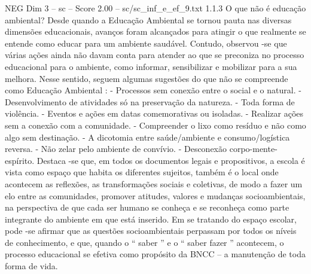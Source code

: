 \begin{textsample}{NEG Dim 3 – sc – Score 2.00 – sc/sc\_inf\_e\_ef\_9.txt}  \label{ex:f3_neg_230}
1.1.3 O que não é educação ambiental?
Desde quando a Educação Ambiental se tornou pauta nas diversas dimensões educacionais, avanços foram alcançados para atingir o que realmente se entende como educar para um ambiente saudável.
Contudo, observou -se que várias ações ainda não davam conta para atender ao que se preconiza no processo educacional para o ambiente, como informar, sensibilizar e mobilizar para a sua melhora.
Nesse sentido, seguem algumas sugestões do que não se compreende como Educação Ambiental : - Processos sem conexão entre o social e o natural. - Desenvolvimento de atividades só na preservação da natureza. - Toda forma de violência. - Eventos e ações em datas comemorativas ou isoladas. - Realizar ações sem a conexão com a comunidade. - Compreender o lixo como resíduo e não como algo sem destinação. - A dicotomia entre saúde/ambiente e consumo/logística reversa. - Não zelar pelo ambiente de convívio. - Desconexão corpo-mente-espírito.
Destaca -se que, em todos os documentos legais e propositivos, a escola é vista como espaço que habita os diferentes sujeitos, também é o local onde acontecem as reflexões, as transformações sociais e coletivas, de modo a fazer um elo entre as comunidades, promover atitudes, valores e mudanças socioambientais, na perspectiva de que cada ser humano se conheça e se reconheça como parte integrante do ambiente em que está inserido.
Em se tratando do espaço escolar, pode -se afirmar que as questões socioambientais perpassam por todos os níveis de conhecimento, e que, quando o “ saber ” e o “ saber fazer ” acontecem, o processo educacional se efetiva como propósito da BNCC – a manutenção de toda forma de vida.

\end{textsample}
